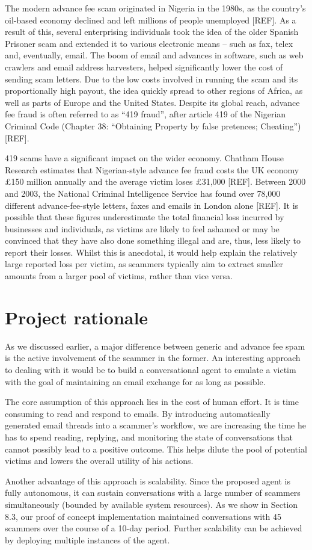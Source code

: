 The modern advance fee scam originated in Nigeria in the 1980s, as the country's oil-based economy declined and left millions of people unemployed [REF]. As a result of this, several enterprising individuals took the idea of the older Spanish Prisoner scam and extended it to various electronic means -- such as fax, telex and, eventually, email. The boom of email and advances in software, such as web crawlers and email address harvesters, helped significantly lower the cost of sending scam letters. Due to the low costs involved in running the scam and its proportionally high payout, the idea quickly spread to other regions of Africa, as well as parts of Europe and the United States. Despite its global reach, advance fee fraud is often referred to as ``419 fraud'', after article 419 of the Nigerian Criminal Code (Chapter 38: “Obtaining Property by false pretences; Cheating”) [REF].

419 scams have a significant impact on the wider economy. Chatham House Research estimates that Nigerian-style advance fee fraud costs the UK economy \pounds150 million annually and the average victim loses \pounds31,000 [REF]. Between 2000 and 2003, the National Criminal Intelligence Service has found over 78,000 different advance-fee-style letters, faxes and emails in London alone [REF]. It is possible that these figures underestimate the total financial loss incurred by businesses and individuals, as victims are likely to feel ashamed or may be convinced that they have also done something illegal and are, thus, less likely to report their losses. Whilst this is anecdotal, it would help explain the relatively large reported loss per victim, as scammers typically aim to extract smaller amounts from a larger pool of victims, rather than vice versa.

\section{Project rationale}
As we discussed earlier, a major difference between generic and advance fee spam is the active involvement of the scammer in the former. An interesting approach to dealing with it would be to build a conversational agent to emulate a victim with the goal of maintaining an email exchange for as long as possible.

The core assumption of this approach lies in the cost of human effort. It is time consuming to read and respond to emails. By introducing automatically generated email threads into a scammer's workflow, we are increasing the time he has to spend reading, replying, and monitoring the state of conversations that cannot possibly lead to a positive outcome. This helps dilute the pool of potential victims and lowers the overall utility of his actions.

Another advantage of this approach is scalability. Since the proposed agent is fully autonomous, it can sustain conversations with a large number of scammers simultaneously (bounded by available system resources). As we show in Section 8.3, our proof of concept implementation maintained conversations with 45 scammers over the course of a 10-day period. Further scalability can be achieved by deploying multiple instances of the agent.
